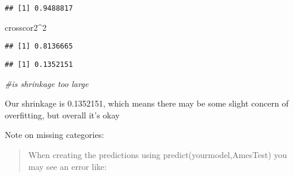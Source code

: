 \documentclass[
]{article}
\newenvironment{Shaded}{\begin{snugshade}}{\end{snugshade}}
\newcommand{\CommentTok}[1]{\textcolor[rgb]{0.56,0.35,0.01}{\textit{#1}}}
\newcommand{\DecValTok}[1]{\textcolor[rgb]{0.00,0.00,0.81}{#1}}
\newcommand{\KeywordTok}[1]{\textcolor[rgb]{0.13,0.29,0.53}{\textbf{#1}}}
\newcommand{\NormalTok}[1]{#1}
\newcommand{\OperatorTok}[1]{\textcolor[rgb]{0.81,0.36,0.00}{\textbf{#1}}}
\newcommand{\StringTok}[1]{\textcolor[rgb]{0.31,0.60,0.02}{#1}}
\begin{document}
\begin{Shaded}
\end{Shaded}

\begin{verbatim}
## [1] 0.9488817
\end{verbatim}

\begin{Shaded}
\begin{Highlighting}[]
\NormalTok{crosscor2}\OperatorTok{^}\DecValTok{2}
\end{Highlighting}
\end{Shaded}

\begin{verbatim}
## [1] 0.8136665
\end{verbatim}

\begin{Shaded}
\end{Shaded}

\begin{verbatim}
## [1] 0.1352151
\end{verbatim}

\begin{Shaded}
\begin{Highlighting}[]
\CommentTok{#is shrinkage too large}
\end{Highlighting}
\end{Shaded}

Our shrinkage is 0.1352151, which means there may be some slight concern
of overfitting, but overall it's okay

Note on missing categories:

\begin{quote}
When creating the predictions using predict(yourmodel,AmesTest) you may
see an error like:
\end{quote}
\end{document}
